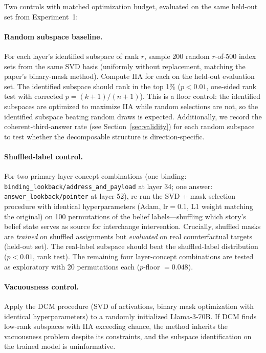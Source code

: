 \documentclass[11pt]{article}
\begin{document}
Two controls with matched optimization budget, evaluated on the same held-out set from Experiment~1:

\paragraph{Random subspace baseline.} For each layer's identified subspace of rank $r$, sample 200 random $r$-of-500 index sets from the same SVD basis (uniformly without replacement, matching the paper's binary-mask method). Compute IIA for each on the held-out evaluation set. The identified subspace should rank in the top 1\% ($p < 0.01$, one-sided rank test with corrected $p = (k + 1)/(n + 1)$). This is a floor control: the identified subspaces are optimized to maximize IIA while random selections are not, so the identified subspace beating random draws is expected. Additionally, we record the coherent-third-answer rate (see Section~\ref{sec:validity}) for each random subspace to test whether the decomposable structure is direction-specific.

\paragraph{Shuffled-label control.} For two primary layer-concept combinations (one binding: \texttt{binding\_lookback/address\_and\_payload} at layer 34; one answer: \texttt{answer\_lookback/pointer} at layer 52), re-run the SVD + mask selection procedure with identical hyperparameters (Adam, $\text{lr} = 0.1$, L1 weight matching the original) on 100 permutations of the belief labels---shuffling which story's belief state serves as source for interchange intervention. Crucially, shuffled masks are \emph{trained} on shuffled assignments but \emph{evaluated} on real counterfactual targets (held-out set). The real-label subspace should beat the shuffled-label distribution ($p < 0.01$, rank test). The remaining four layer-concept combinations are tested as exploratory with 20 permutations each ($p$-floor $= 0.048$).

\paragraph{Vacuousness control.} Apply the DCM procedure (SVD of activations, binary mask optimization with identical hyperparameters) to a randomly initialized Llama-3-70B. If DCM finds low-rank subspaces with IIA exceeding chance, the method inherits the \citet{sutter2025vacuous} vacuousness problem despite its constraints, and the subspace identification on the trained model is uninformative.
\end{document}
